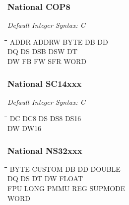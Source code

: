 \subsubsection{National COP8}

{\em Default Integer Syntax: C}

{\tt\begin{tabbing}
\hspace{3cm}\=\hspace{3cm}\=\hspace{3cm}\=\hspace{3cm}\=\kill
ADDR       \> ADDRW       \> BYTE        \> DB          \> DD \\
DQ         \> DS          \> DSB         \> DSW         \> DT \\
DW         \> FB          \> FW          \> SFR         \> WORD \\
\end{tabbing}}

\subsubsection{National SC14xxx}

{\em Default Integer Syntax: C}

{\tt\begin{tabbing}
\hspace{3cm}\=\hspace{3cm}\=\hspace{3cm}\=\hspace{3cm}\=\kill
DC         \> DC8         \> DS          \> DS8         \> DS16 \\
DW         \> DW16 \\
\end{tabbing}}

\subsubsection{National NS32xxx}
{\tt\begin{tabbing}
\hspace{3cm}\=\hspace{3cm}\=\hspace{3cm}\=\hspace{3cm}\=\kill
BYTE       \> CUSTOM      \> DB         \> DD           \> DOUBLE \\
DQ         \> DS          \> DT         \> DW           \> FLOAT \\
FPU        \> LONG        \> PMMU       \> REG          \> SUPMODE \\
WORD \\
\end{tabbing}}

